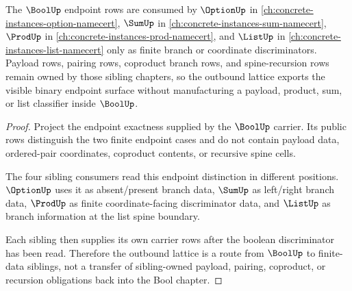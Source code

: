 \begin{theorem}
\label{thm:bool-finite-data-outbound-lattice}
The $\BoolUp$ endpoint rows are consumed by $\OptionUp$ in \autoref{ch:concrete-instances-option-namecert}, $\SumUp$ in \autoref{ch:concrete-instances-sum-namecert}, $\ProdUp$ in \autoref{ch:concrete-instances-prod-namecert}, and $\ListUp$ in \autoref{ch:concrete-instances-list-namecert} only as finite branch or coordinate discriminators. Payload rows, pairing rows, coproduct branch rows, and spine-recursion rows remain owned by those sibling chapters, so the outbound lattice exports the visible binary endpoint surface without manufacturing a payload, product, sum, or list classifier inside $\BoolUp$.
\end{theorem}
\begin{proof}
Project the endpoint exactness supplied by the $\BoolUp$ carrier. Its public rows distinguish the two finite endpoint cases and do not contain payload data, ordered-pair coordinates, coproduct contents, or recursive spine cells.

The four sibling consumers read this endpoint distinction in different positions. $\OptionUp$ uses it as absent/present branch data, $\SumUp$ as left/right branch data, $\ProdUp$ as finite coordinate-facing discriminator data, and $\ListUp$ as branch information at the list spine boundary.

Each sibling then supplies its own carrier rows after the boolean discriminator has been read. Therefore the outbound lattice is a route from $\BoolUp$ to finite-data siblings, not a transfer of sibling-owned payload, pairing, coproduct, or recursion obligations back into the Bool chapter.
\end{proof}
